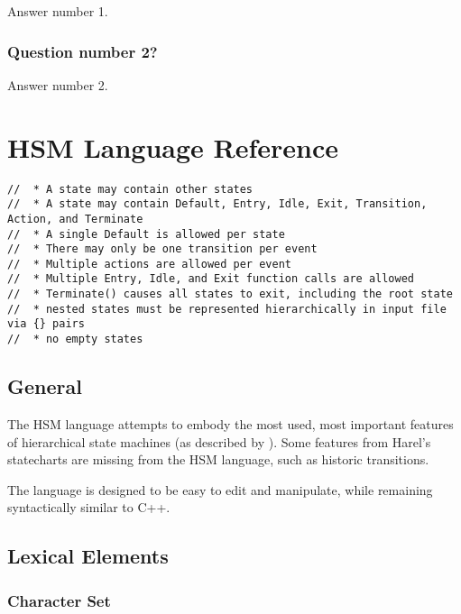 \documentclass[titlepage,letterpaper]{report}
\begin{document}
Answer number 1.

\subsection{Question number 2?}

Answer number 2.












\chapter{HSM Language Reference}

\begin{verbatim}
//  * A state may contain other states
//  * A state may contain Default, Entry, Idle, Exit, Transition, Action, and Terminate
//  * A single Default is allowed per state
//  * There may only be one transition per event
//  * Multiple actions are allowed per event
//  * Multiple Entry, Idle, and Exit function calls are allowed
//  * Terminate() causes all states to exit, including the root state
//  * nested states must be represented hierarchically in input file via {} pairs
//  * no empty states
\end{verbatim}

\section{General}

The HSM language attempts to embody the most used, most important features
of hierarchical state machines (as described by \cite{harel:sta}).  Some features
from Harel's statecharts are missing from the HSM language, such as historic
transitions.

The language is designed to be easy to edit and manipulate, while remaining 
syntactically similar to C++.

\section{Lexical Elements}

\label{hsm:lexical}

\subsection{Character Set}
\end{document}
